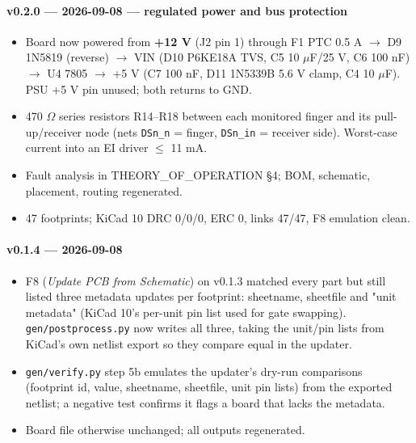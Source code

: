 \documentclass[11pt,a4paper]{article}
\begin{document}
\paragraph{v0.2.0 — 2026-09-08 — regulated power and bus protection}
\begin{itemize}[leftmargin=8mm]
\item Board now powered from \textbf{+12 V} (J2 pin 1) through F1 PTC 0.5 A $\to$ D9 1N5819 (reverse) $\to$ VIN (D10 P6KE18A TVS, C5 10 $\mu$F/25 V, C6 100 nF) $\to$ U4 7805 $\to$ +5 V (C7 100 nF, D11 1N5339B 5.6 V clamp, C4 10 $\mu$F). PSU +5 V pin unused; both returns to GND.
\item 470 $\Omega$ series resistors R14–R18 between each monitored finger and its pull-up/receiver node (nets \texttt{DSn\_n} = finger, \texttt{DSn\_in} = receiver side). Worst-case current into an EI driver $\le$ 11 mA.
\item Fault analysis in THEORY\_OF\_OPERATION §4; BOM, schematic, placement, routing regenerated.
\item 47 footprints; KiCad 10 DRC 0/0/0, ERC 0, links 47/47, F8 emulation clean.
\end{itemize}
\paragraph{v0.1.4 — 2026-09-08}
\begin{itemize}[leftmargin=8mm]
\item F8 (\emph{Update PCB from Schematic}) on v0.1.3 matched every part but still listed three metadata updates per footprint: sheetname, sheetfile and "unit metadata" (KiCad 10's per-unit pin list used for gate swapping). \texttt{gen/postprocess.py} now writes all three, taking the unit/pin lists from KiCad's own netlist export so they compare equal in the updater.
\item \texttt{gen/verify.py} step 5b emulates the updater's dry-run comparisons (footprint id, value, sheetname, sheetfile, unit pin lists) from the exported netlist; a negative test confirms it flags a board that lacks the metadata.
\item Board file otherwise unchanged; all outputs regenerated.
\end{itemize}
\end{document}
